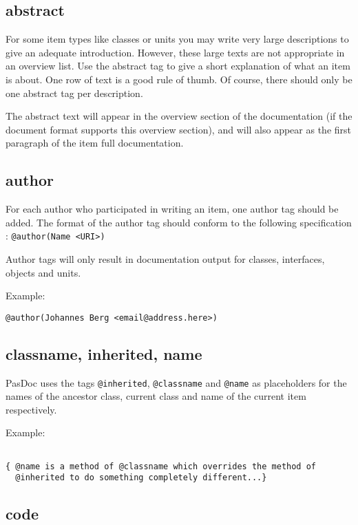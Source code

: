 \documentclass[11pt]{article}
\begin{document}
\subsection{abstract}

For some item types like classes or units you may write very large
descriptions to give an adequate introduction.
However, these large texts are not appropriate in an overview list.
Use the abstract tag to give a short explanation of what an item
is about. 
One row of text is a good rule of thumb.
Of course, there should only be one abstract tag per description.

The abstract text will appear in the overview section of the
documentation (if the document format supports this overview section), 
and will also appear as the first paragraph of the item full 
documentation.

\subsection{author}

For each author who participated in writing an item, one author tag
should be added. The format of the author tag should conform to
the following specification : {\tt @author(Name <URI>)}

Author tags will only result in documentation output for
classes, interfaces, objects and units.

Example:
\begin{verbatim}
@author(Johannes Berg <email@address.here>)
\end{verbatim}

\subsection{classname, inherited, name}

PasDoc uses the tags {\tt @inherited}, {\tt @classname} and {\tt @name} as 
placeholders for the names of the ancestor class, current class and name of the 
current item respectively.

Example:
\begin{verbatim}

{ @name is a method of @classname which overrides the method of 
  @inherited to do something completely different...}
\end{verbatim}

\subsection{code}
\end{document}
